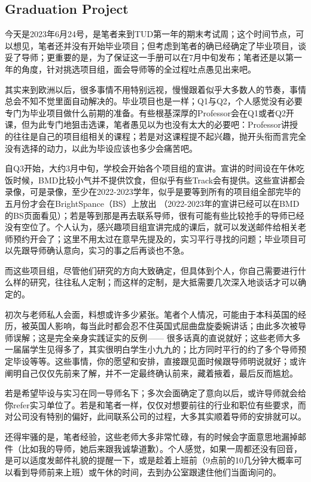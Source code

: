 \subsection{Graduation Project}

今天是2023年6月24号，是笔者来到TUD第一年的期末考试周；这个时间节点，可以想见，笔者还并没有开始毕业项目；但考虑到笔者的确已经确定了毕业项目，谈妥了导师；更重要的是，为了保证这一手册可以在7月中旬发布；笔者还是以第一年的角度，针对挑选项目组，面会导师等的全过程吐点愚见出来吧。

其实来到欧洲以后，很多事情不用特别远视，慢慢跟着似乎大多数人的节奏，事情总会不知不觉里面自动解决的。毕业项目也是一样；Q1与Q2，个人感觉没有必要专门为毕业项目做什么前期的准备。有些根基深厚的Professor会在Q1或者Q2开课，但为此专门地狙击选课，笔者愚见以为也没有太大的必要吧：Professor讲授的往往是自己的项目组相关的课程；若是对这课程提不起兴趣，抛开头衔而言完全没有选择的动力，以此为毕设应该也多少会痛苦吧。

自Q3开始，大约3月中旬，学校会开始各个项目组的宣讲。宣讲的时间设在午休吃饭时候，BMD比较小气并不提供饮食，但似乎有些Track会有提供。这些宣讲都会录像，可是录像，至少在2022-2023学年，似乎是要等到所有的项目组全部完毕的五月份才会在BrightSpance（BS）上放出 （2022-2023年的宣讲已经可以在BMD的BS页面看见）；若是等到那是再去联系导师，很有可能有些比较抢手的导师已经没有空位了。个人认为，感兴趣项目组宣讲完成的课后，就可以发送邮件给相关老师预约开会了；这里不用太过在意早先提及的，实习平行寻找的问题；毕业项目可以先跟导师确认意向，实习的事之后再谈也不急。

而这些项目组，尽管他们研究的方向大致确定，但具体到个人，你自己需要进行什么样的研究，往往私人定制；而这样的定制，是大抵需要几次深入地谈话才可以确定的。

初次与老师私人会面，料想或许多少紧张。笔者个人情况，可能由于本科英国的经历，被英国人影响，每当此时都会忍不住英国式屈曲盘旋委婉讲话；由此多次被导师误解；这是完全亲身实践证实的反例—— 很多话真的直说就好；这些老师大多一届届学生见得多了，其实很明白学生小九九的；比方同时平行的约了多个导师预定毕设等等。这些事情，你的愿望和安排，直接跟见面时候跟导师明说就好；或许阐明自己仅仅先前来了解，并不一定最终确认前来，藏着掖着，最后反而尴尬。

若是希望毕设与实习在同一导师名下；多次会面确定了意向以后，或许导师就会给你refer实习单位了。若是和笔者一样，仅仅对想要前往的行业和职位有些要求，而对公司没有特别的偏好，此间联系公司的过程，大多其实顺着导师的安排就可以。

还得牢骚的是，笔者经验，这些老师大多非常忙碌，有的时候会字面意思地漏掉邮件（比如我的导师，她后来跟我诚挚道歉）。个人感觉，如果一周都还没有回音，是可以适度发邮件礼貌的提醒一下，或是趁着上班前（9点前的10几分钟大概率可以看到导师前来上班）或午休的时间，去到办公室跟逮住他们当面询问的。


